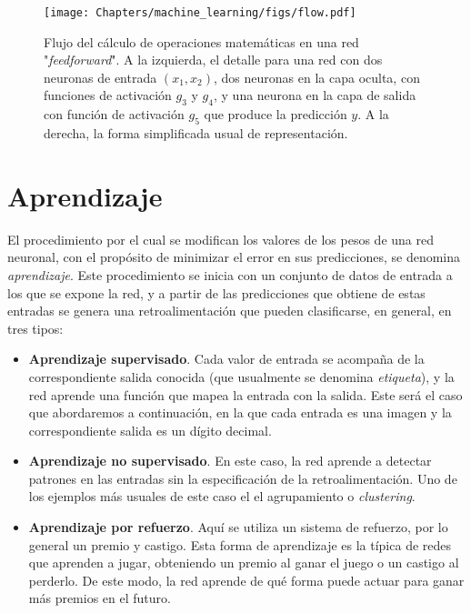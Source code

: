 \begin{figure}[t]
    \begin{center}
    \texttt{[image: Chapters/machine\_learning/figs/flow.pdf]}
\end{center}
\caption{Flujo del cálculo de operaciones matemáticas en una red "\textit{feedforward}". A la izquierda, el detalle para una red con dos neuronas de entrada $(x_1, x_2)$, dos neuronas en la capa oculta, con funciones de activación $g_3$ y $g_4$, y una neurona en la capa de salida con función de activación $g_5$ que produce la predicción $y$. A la derecha, la forma simplificada usual de representación.}
\label{fig:flujo}
\end{figure}


\section{Aprendizaje}

El procedimiento por el cual se modifican los valores de los pesos de una red neuronal, con el propósito de minimizar el error en sus predicciones, se denomina \textit{aprendizaje}. Este procedimiento se inicia con un conjunto de datos de entrada a los que se expone la red, y a partir de las predicciones que obtiene de estas entradas se genera una retroalimentación que pueden clasificarse, en general, en tres tipos:
\begin{itemize}
    \item \textbf{Aprendizaje supervisado}. Cada valor de entrada se acompaña de la correspondiente salida conocida (que usualmente se denomina \textit{etiqueta}), y la red aprende una función que mapea la entrada con la salida. Este será el caso que abordaremos a continuación, en la que cada entrada es una imagen y la correspondiente salida es un dígito decimal.
    \item \textbf{Aprendizaje no supervisado}. En este caso, la red aprende a detectar patrones en las entradas sin la especificación de la retroalimentación. Uno de los ejemplos más usuales de este caso el el agrupamiento o \textit{clustering}.
    \item \textbf{Aprendizaje por refuerzo}. Aquí se utiliza un sistema de refuerzo, por lo general un premio y castigo. Esta forma de aprendizaje es la típica de redes que aprenden a jugar, obteniendo un premio al ganar el juego o un castigo al perderlo. De este modo, la red aprende de qué forma puede actuar para ganar más premios en el futuro.
\end{itemize}

